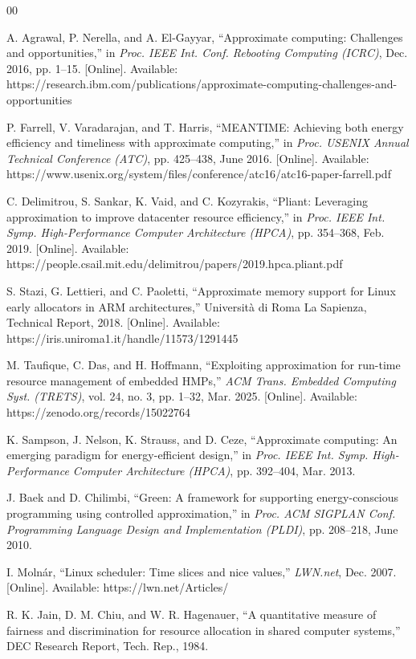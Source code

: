 \documentclass[conference]{IEEEtran}
\begin{document}
\begin{thebibliography}{00}

 A. Agrawal, P. Nerella, and A. El-Gayyar, ``Approximate computing: Challenges and opportunities,'' in \textit{Proc. IEEE Int. Conf. Rebooting Computing (ICRC)}, Dec. 2016, pp. 1--15. [Online]. Available: https://research.ibm.com/publications/approximate-computing-challenges-and-opportunities

 P. Farrell, V. Varadarajan, and T. Harris, ``MEANTIME: Achieving both energy efficiency and timeliness with approximate computing,'' in \textit{Proc. USENIX Annual Technical Conference (ATC)}, pp. 425--438, June 2016. [Online]. Available: https://www.usenix.org/system/files/conference/atc16/atc16-paper-farrell.pdf

 C. Delimitrou, S. Sankar, K. Vaid, and C. Kozyrakis, ``Pliant: Leveraging approximation to improve datacenter resource efficiency,'' in \textit{Proc. IEEE Int. Symp. High-Performance Computer Architecture (HPCA)}, pp. 354--368, Feb. 2019. [Online]. Available: https://people.csail.mit.edu/delimitrou/papers/2019.hpca.pliant.pdf

 S. Stazi, G. Lettieri, and C. Paoletti, ``Approximate memory support for Linux early allocators in ARM architectures,'' Università di Roma La Sapienza, Technical Report, 2018. [Online]. Available: https://iris.uniroma1.it/handle/11573/1291445

 M. Taufique, C. Das, and H. Hoffmann, ``Exploiting approximation for run-time resource management of embedded HMPs,'' \textit{ACM Trans. Embedded Computing Syst. (TRETS)}, vol. 24, no. 3, pp. 1--32, Mar. 2025. [Online]. Available: https://zenodo.org/records/15022764

 K. Sampson, J. Nelson, K. Strauss, and D. Ceze, ``Approximate computing: An emerging paradigm for energy-efficient design,'' in \textit{Proc. IEEE Int. Symp. High-Performance Computer Architecture (HPCA)}, pp. 392--404, Mar. 2013.

 J. Baek and D. Chilimbi, ``Green: A framework for supporting energy-conscious programming using controlled approximation,'' in \textit{Proc. ACM SIGPLAN Conf. Programming Language Design and Implementation (PLDI)}, pp. 208--218, June 2010.

 I. Molnár, ``Linux scheduler: Time slices and nice values,'' \textit{LWN.net}, Dec. 2007. [Online]. Available: https://lwn.net/Articles/

 R. K. Jain, D. M. Chiu, and W. R. Hagenauer, ``A quantitative measure of fairness and discrimination for resource allocation in shared computer systems,'' DEC Research Report, Tech. Rep., 1984.


\end{thebibliography}
\end{document}
